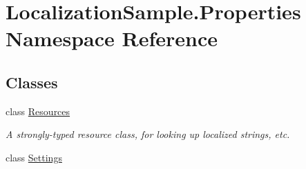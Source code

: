 \hypertarget{namespace_localization_sample_1_1_properties}{}\section{Localization\+Sample.\+Properties Namespace Reference}
\label{namespace_localization_sample_1_1_properties}
\subsection*{Classes}
\begin{DoxyCompactItemize}
\item 
class \mbox{\hyperlink{class_localization_sample_1_1_properties_1_1_resources}{Resources}}
\begin{DoxyCompactList}\small\item\em A strongly-\/typed resource class, for looking up localized strings, etc. \end{DoxyCompactList}\item 
class \mbox{\hyperlink{class_localization_sample_1_1_properties_1_1_settings}{Settings}}
\end{DoxyCompactItemize}
